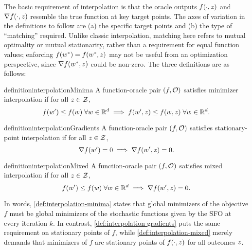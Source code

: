 The basic requirement of interpolation is that the oracle outputs \( f(\cdot, \z) \) and \( \grad(\cdot, \z) \) resemble the true function at key target points.  
The axes of variation in the definitions to follow are (a) the specific target points and (b) the type of ``matching'' required.
Unlike classic interpolation, matching here refers to mutual optimality or mutual stationarity, rather than a requirement for equal function values; 
enforcing \( f(\wopt) = f(\wopt, \z) \) may not be useful from an optimization perspective, since \( \grad(\wopt, \z) \) could be non-zero.
The three definitions are as follows:

\begin{restatable}{definition}{interpolationMinima}\label{def:interpolation-minima}
    A function-oracle pair \( (f, \oracle{}) \) satisfies minimizer interpolation if for all \( \z \in \calZ \),
    \[ f(\w') \leq f(\w) \; \forall \w \in \R^d \implies f(\w', \z) \leq f(\w, \z) \; \forall \w \in \R^d.  \]
\end{restatable}
\begin{restatable}{definition}{interpolationGradients}\label{def:interpolation-gradients}
    A function-oracle pair \( (f, \oracle{}) \) satisfies stationary-point interpolation if for all \( \z \in \calZ \),
    \[ \grad(\w') = 0 \implies \grad(\w', \z) = 0. \]
\end{restatable}
\begin{restatable}{definition}{interpolationMixed}\label{def:interpolation-mixed}
    A function-oracle pair \( (f, \oracle{}) \) satisfies mixed interpolation if for all \( \z \in \calZ \),
    \[ f(\w') \leq f(\w) \; \forall \w \in \R^d \implies \grad(\w', \z) = 0. \]
\end{restatable}
In words, \autoref{def:interpolation-minima} states that global minimizers of the objective \( f \) must be global minimizers of the stochastic functions given by the \ac{SFO} at every iteration \( k \).
In contrast, \autoref{def:interpolation-gradients} puts the same requirement on stationary points of \( f \), while \autoref{def:interpolation-mixed} merely demands that minimizers of \( f \) are stationary points of \( f(\cdot, \z) \) for all outcomes \( \z \).

